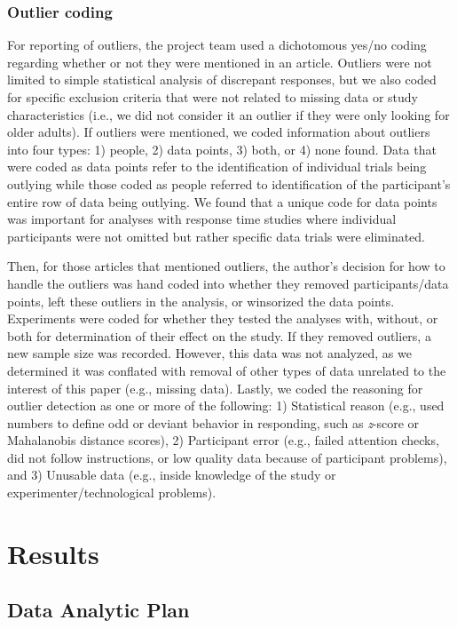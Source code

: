\documentclass[english,,man,mask]{apa6}
\theoremstyle{definition}
\theoremstyle{definition}
\theoremstyle{definition}
\theoremstyle{remark}
\begin{document}
\subsubsection{Outlier coding}\label{outlier-coding}

For reporting of outliers, the project team used a dichotomous yes/no
coding regarding whether or not they were mentioned in an article.
Outliers were not limited to simple statistical analysis of discrepant
responses, but we also coded for specific exclusion criteria that were
not related to missing data or study characteristics (i.e., we did not
consider it an outlier if they were only looking for older adults). If
outliers were mentioned, we coded information about outliers into four
types: 1) people, 2) data points, 3) both, or 4) none found. Data that
were coded as data points refer to the identification of individual
trials being outlying while those coded as people referred to
identification of the participant's entire row of data being outlying.
We found that a unique code for data points was important for analyses
with response time studies where individual participants were not
omitted but rather specific data trials were eliminated.

Then, for those articles that mentioned outliers, the author's decision
for how to handle the outliers was hand coded into whether they removed
participants/data points, left these outliers in the analysis, or
winsorized the data points. Experiments were coded for whether they
tested the analyses with, without, or both for determination of their
effect on the study. If they removed outliers, a new sample size was
recorded. However, this data was not analyzed, as we determined it was
conflated with removal of other types of data unrelated to the interest
of this paper (e.g., missing data). Lastly, we coded the reasoning for
outlier detection as one or more of the following: 1) Statistical reason
(e.g., used numbers to define odd or deviant behavior in responding,
such as \emph{z}-score or Mahalanobis distance scores), 2) Participant
error (e.g., failed attention checks, did not follow instructions, or
low quality data because of participant problems), and 3) Unusable data
(e.g., inside knowledge of the study or experimenter/technological
problems).

\section{Results}\label{results}

\subsection{Data Analytic Plan}\label{data-analytic-plan}
\end{document}
